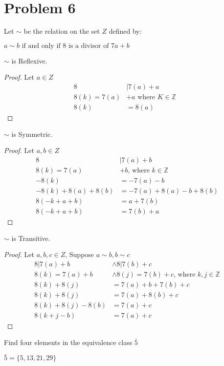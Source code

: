 \documentclass{article}
\newenvironment{problem}[1]{
  \nobreak\section*{Problem #1}
}{}
\begin{document}
  \begin{problem}{6}
    Let $\sim$ be the relation on the set $Z$ defined by:
    \begin{center}
      $a \sim b \text{ if and only if } 8 \text{ is a divisor of } 7a + b$
    \end{center}

    $\sim$ is Reflexive.
    \begin{proof}
      Let $a \in Z$
      \begin{equation*}
        \begin{split}
          8 & | 7(a) + a\\
          8(k) = 7(a) & + a \text{ where $K \in \mathbb Z$ }\\
          8(k) & = 8(a)
        \end{split}
      \end{equation*}
    \end{proof}

    $\sim$ is Symmetric.
    \begin{proof}
      Let $a, b \in Z$
      \begin{equation*}
        \begin{split}
          8 & | 7(a) + b\\
          8(k) = 7(a) & + b \text{, where $k \in \mathbb Z$}\\
          -8(k) & = -7(a) - b\\
          -8(k) + 8(a) + 8(b) & = -7(a) + 8(a) - b + 8(b)\\
          8(-k + a + b) & = a + 7(b)\\
          8(-k + a + b) & = 7(b) + a
        \end{split}
      \end{equation*}
    \end{proof}

    $\sim$ is Transitive.
    \begin{proof}
      Let $a, b, c \in Z$, Suppose $a \sim b, b \sim c$
      \begin{equation*}
        \begin{split}
          8 | 7(a) + b & \wedge 8 | 7(b) + c\\
          8(k) = 7(a) + b & \wedge 8(j) = 7(b) + c \text{, where $k, j \in \mathbb Z$}\\
          8(k) + 8(j) & = 7(a) + b + 7(b) + c\\
          8(k) + 8(j) & = 7(a) + 8(b) + c\\
          8(k) + 8(j) - 8(b) & = 7(a) + c\\
          8(k + j - b) & = 7(a) + c
        \end{split}
      \end{equation*}
    \end{proof}

    Find four elements in the equivalence class $\bar{5}$
    \begin{center}
      $\bar{5} = \{5, 13, 21, 29\}$
    \end{center}
  \end{problem}
\end{document}
